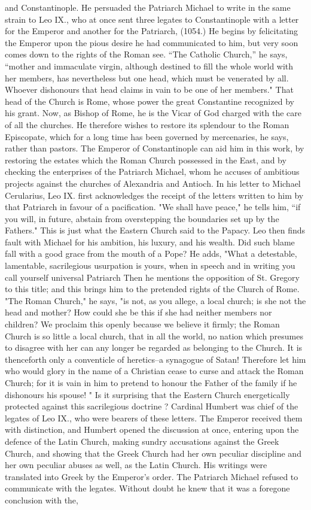 and Constantinople. He persuaded the Patriarch Michael to write in the same strain to Leo IX., who at once sent three legates to Constantinople with a letter for the Emperor and another for the Patriarch, (1054.) He begins by felicitating the Emperor upon the pious desire he had communicated to him, but very soon comes down to the rights of the Roman see. “The Catholic Church,” he says, “mother and immaculate virgin, although destined to fill the whole world with her members, has nevertheless but one head, which must be venerated by all. Whoever dishonours that head claims in vain to be one of her members." That head of the Church is Rome, whose power the great Constantine recognized by his grant. Now, as Bishop of Rome, he is the Vicar of God charged with the care of all the churches. He therefore wishes to restore its splendour to the Roman Episcopate, which for a long time has been governed by mercenaries, he says, rather than pastors. The Emperor of Constantinople can aid him in this work, by restoring the estates which the Roman Church possessed in the East, and by checking the enterprises of the Patriarch Michael, whom he accuses of ambitious projects against the churches of Alexandria and Antioch. In his letter to Michael Cerularius, Leo IX. first acknowledges the receipt of the letters written to him by that Patriarch in favour of a pacification. "We shall have peace," he tells him, “if you will, in future, abstain from overstepping the boundaries set up by the Fathers." This is just what the Eastern Church said to the Papacy. Leo then finds fault with Michael for his ambition, his luxury, and his wealth. Did such blame fall with a good grace from the mouth of a Pope? He adds, "What a detestable, lamentable, sacrilegious usurpation is yours, when in speech and in writing you call yourself universal Patriarch Then he mentions the opposition of St. Gregory to this title; and this brings him to the pretended rights of the Church of Rome. "The Roman Church," he says, "is not, as you allege, a local church; is she not the head and mother? How could she be this if she had neither members nor children? We proclaim this openly because we believe it firmly; the Roman Church is so little a local church, that in all the world, no nation which presumes to disagree with her can any longer be regarded as belonging to the Church. It is thenceforth only a conventicle of heretics--a synagogue of Satan! Therefore let him who would glory in the name of a Christian cease to curse and attack the Roman Church; for it is vain in him to pretend to honour the Father of the family if he dishonours his spouse! " Is it surprising that the Eastern Church energetically protected against this sacrilegious doctrine ? Cardinal Humbert was chief of the legates of Leo IX., who were bearers of these letters. The Emperor received them with distinction, and Humbert opened the discussion at once, entering upon the defence of the Latin Church, making sundry accusations against the Greek Church, and showing that the Greek Church had her own peculiar discipline and her own peculiar abuses as well, as the Latin Church. His writings were translated into Greek by the Emperor's order. The Patriarch Michael refused to communicate with the legates. Without doubt he knew that it was a foregone conclusion with the, 